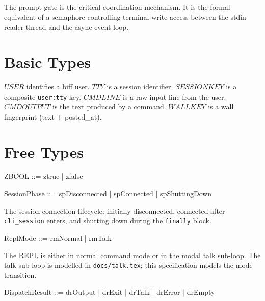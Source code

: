 \documentclass[a4paper,10pt,fleqn]{article}
\begin{document}
The prompt gate is the critical coordination mechanism.  It is the
formal equivalent of a semaphore controlling terminal write access
between the stdin reader thread and the async event loop.

\section{Basic Types}

\begin{zed}
\end{zed}

$USER$ identifies a biff user.  $TTY$ is a session identifier.
$SESSIONKEY$ is a composite \texttt{user:tty} key.  $CMDLINE$ is
a raw input line from the user.  $CMDOUTPUT$ is the text produced
by a command.  $WALLKEY$ is a wall fingerprint (text + posted\_at).

\section{Free Types}

\begin{zed}
  ZBOOL ::= ztrue | zfalse
\end{zed}

\begin{zed}
  SessionPhase ::= spDisconnected | spConnected | spShuttingDown
\end{zed}

The session connection lifecycle: initially disconnected, connected
after \texttt{cli\_session} enters, and shutting down during the
\texttt{finally} block.

\begin{zed}
  ReplMode ::= rmNormal | rmTalk
\end{zed}

The REPL is either in normal command mode or in the modal talk
sub-loop.  The talk sub-loop is modelled in \texttt{docs/talk.tex};
this specification models the mode transition.

\begin{zed}
  DispatchResult ::= drOutput | drExit | drTalk | drError | drEmpty
\end{zed}
\end{document}
